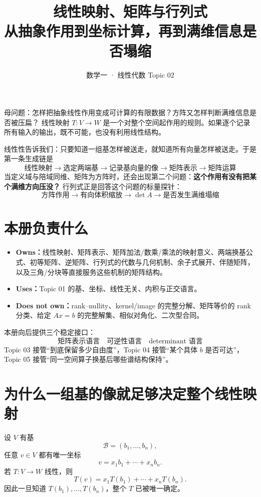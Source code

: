 \documentclass[11pt,a4paper]{ctexart}
\title{\vspace{-1.1cm}\textbf{线性映射、矩阵与行列式}\\[0.4em]
\large 从抽象作用到坐标计算，再到满维信息是否塌缩}
\author{数学一 · 线性代数 Topic 02}
\date{}
\newcommand{\kw}[1]{\textbf{\color{deep}#1}}
\begin{document}
\maketitle

\begin{corebox}{母问题：怎样把抽象线性作用变成可计算的有限数据？方阵又怎样判断满维信息是否被压扁？}
线性映射 $T:V\to W$ 是一个对整个空间起作用的规则。如果逐个记录所有输入的输出，既不可能，也没有利用线性结构。

线性性告诉我们：只要知道一组基怎样被送走，就知道所有向量怎样被送走。于是第一条生成链是
\[
\boxed{
\text{线性映射}
\to \text{选定两端基}
\to \text{记录基向量的像}
\to \text{矩阵表示}
\to \text{矩阵运算}
}
\]
当定义域与陪域同维、矩阵为方阵时，还会出现第二个问题：\kw{这个作用有没有把某个满维方向压没？} 行列式正是回答这个问题的标量探针：
\[
\boxed{
\text{方阵作用}
\to \text{有向体积缩放}
\to \det A
\to \text{是否发生满维塌缩}
}
\]
\end{corebox}

\section{本册负责什么}

\begin{itemize}
  \item \kw{Owns：}线性映射、矩阵表示、矩阵加法/数乘/乘法的映射意义、两端换基公式、初等矩阵、逆矩阵、行列式的代数与几何机制、余子式展开、伴随矩阵，以及三角/分块等直接服务这些机制的矩阵结构。
  \item \kw{Uses：}Topic 01 的基、坐标、线性无关、内积与正交语言。
  \item \kw{Does not own：}rank--nullity、kernel/image 的完整分解、矩阵等价的 rank 分类、给定 $Ax=b$ 的完整解集、相似对角化、二次型合同。
\end{itemize}

本册向后提供三个稳定接口：
\[
\boxed{\text{矩阵表示语言}\quad\text{可逆性语言}\quad\text{determinant 语言}}
\]
Topic 03 接管“到底保留多少自由度”，Topic 04 接管“某个具体 $b$ 是否可达”，Topic 05 接管“同一空间算子换基后哪些谱结构保持”。

\section{为什么一组基的像就足够决定整个线性映射}

设 $V$ 有基
\[
\mathcal B=(b_1,\dots,b_n),
\]
任意 $v\in V$ 都有唯一坐标
\[
v=x_1b_1+\cdots+x_nb_n.
\]
若 $T:V\to W$ 线性，则
\[
T(v)=x_1T(b_1)+\cdots+x_nT(b_n).
\]
因此一旦知道 $T(b_1),\dots,T(b_n)$，整个 $T$ 已被唯一确定。
\end{document}
